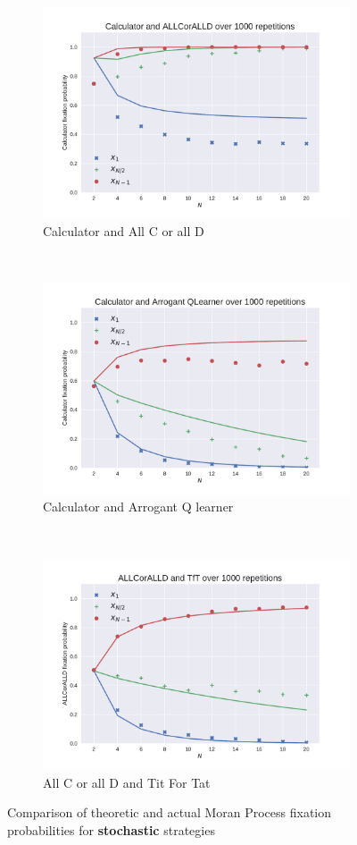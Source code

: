 \documentclass{article}
\begin{document}
\begin{figure}[!hbtp]
    \begin{subfigure}[t]{.3\textwidth}
        \centering
        \includegraphics[width=.8\textwidth]{./img/Calculator_v_ALLCorALLD.pdf}
        \caption{Calculator and All C or all D}
    \end{subfigure}%
    ~
    \begin{subfigure}[t]{.3\textwidth}
        \centering
        \includegraphics[width=.8\textwidth]{./img/Calculator_v_Arrogant_QLearner.pdf}
        \caption{Calculator and Arrogant Q learner}
    \end{subfigure}%
    ~
    \begin{subfigure}[t]{.3\textwidth}
        \centering
        \includegraphics[width=.8\textwidth]{./img/ALLCorALLD_v_TfT.pdf}
        \caption{All C or all D and Tit For Tat}
    \end{subfigure}%
    \caption{Comparison of theoretic and actual Moran Process
             fixation probabilities for \textbf{stochastic} strategies}
    \label{fig:comparison_stochastic}
\end{figure}
\end{document}
